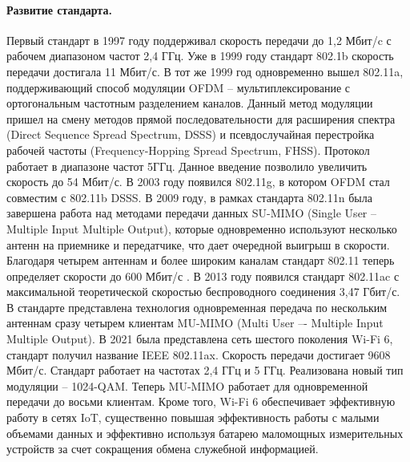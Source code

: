 \paragraph{Развитие стандарта.}
Первый стандарт в 1997 году поддерживал скорость передачи до 1,2 Мбит/c с рабочем диапазоном частот 2,4 ГГц. Уже в 1999 году стандарт 802.1b скорость передачи достигала 11 Мбит/с. В тот же 1999 год одновременно вышел 802.11a, поддерживающий способ модуляции OFDM -- мультиплексирование с ортогональным частотным разделением каналов. Данный метод модуляции пришел на смену методов прямой последовательности для расширения спектра (Direct Sequence Spread Spectrum, DSSS) и псевдослучайная перестройка рабочей частоты (Frequency-Hopping Spread Spectrum, FHSS). Протокол работает в диапазоне частот 5ГГц. Данное введение позволило увеличить скорость до 54 Мбит/с. В 2003 году появился 802.11g, в котором OFDM стал совместим с 802.11b DSSS.  В 2009 году, в рамках стандарта 802.11n была завершена работа над методами передачи данных SU-MIMO (Single User -- Multiple Input Multiple Output), которые одновременно используют несколько антенн на приемнике и передатчике, что дает очередной выигрыш в скорости. Благодаря четырем антеннам и более широким каналам стандарт 802.11 теперь определяет скорости до 600 Мбит/с \cite{Tanenbaum2022, Coleman2018}. В 2013 году появился стандарт 802.11ac с максимальной теоретической скоростью беспроводного соединения 3,47 Гбит/с. В стандарте представлена технология одновременная передача по нескольким антеннам сразу четырем клиентам MU-MIMO (Multi User –- Multiple Input Multiple Output). В 2021 была представлена сеть шестого поколения Wi-Fi 6, стандарт получил название IEEE 802.11ax. Скорость передачи достигает 9608 Мбит/с. Стандарт работает на частотах 2,4 ГГц и 5 ГГц. Реализована новый тип модуляции -- 1024-QAM. Теперь MU-MIMO работает для одновременной передачи до восьми клиентам.  Кроме того, Wi-Fi 6 обеспечивает эффективную работу в сетях IoT, существенно повышая эффективность работы с малыми объемами данных и эффективно используя батарею маломощных измерительных устройств за счет сокращения обмена служебной информацией.

